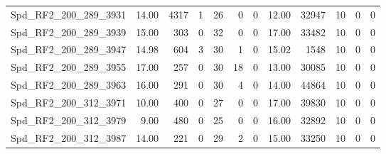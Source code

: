 \begin{longtable}[c]{@{}lrrrrrrrrrrr@{}}
Spd\_RF2\_200\_289\_3931     & 14.00                  & 4317                    & 1                       & 26                     & 0                       & 0                       & 12.00                   & 32947                    & 10                       & 0                        & 0                        \\
Spd\_RF2\_200\_289\_3939     & 15.00                  & 303                     & 0                       & 32                     & 0                       & 0                       & 17.00                   & 33482                    & 10                       & 0                        & 0                        \\
Spd\_RF2\_200\_289\_3947     & 14.98                  & 604                     & 3                       & 30                     & 1                       & 0                       & 15.02                   & 1548                     & 10                       & 0                        & 0                        \\
Spd\_RF2\_200\_289\_3955     & 17.00                  & 257                     & 0                       & 30                     & 18                      & 0                       & 13.00                   & 30085                    & 10                       & 0                        & 0                        \\
Spd\_RF2\_200\_289\_3963     & 16.00                  & 291                     & 0                       & 30                     & 4                       & 0                       & 14.00                   & 44864                    & 10                       & 0                        & 0                        \\
Spd\_RF2\_200\_312\_3971     & 10.00                  & 400                     & 0                       & 27                     & 0                       & 0                       & 17.00                   & 39830                    & 10                       & 0                        & 0                        \\
Spd\_RF2\_200\_312\_3979     & 9.00                   & 480                     & 0                       & 25                     & 0                       & 0                       & 16.00                   & 32892                    & 10                       & 0                        & 0                        \\
Spd\_RF2\_200\_312\_3987     & 14.00                  & 221                     & 0                       & 29                     & 2                       & 0                       & 15.00                   & 33250                    & 10                       & 0                        & 0                        \\

\end{longtable}
